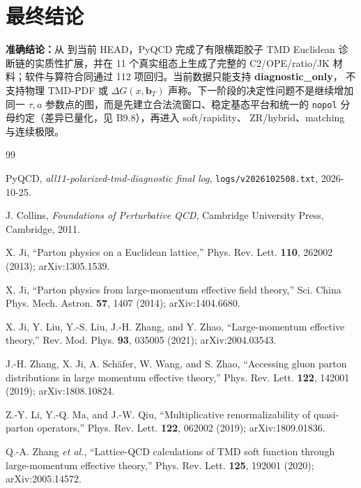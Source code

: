\documentclass[UTF8]{ctexart}
\newcommand{\code}[1]{\texttt{\detokenize{#1}}}
\newcommand{\pathref}[1]{\texttt{\nolinkurl{#1}}}
\newcommand{\bT}{\boldsymbol b_T}
\newcommand{\statusdiag}{\textcolor{warn}{\textbf{diagnostic\_only}}}
\begin{document}
\section{最终结论}

\begin{conclbox}
\textbf{准确结论：}从 \code{dev25} 到当前 HEAD，PyQCD 完成了有限横距胶子 TMD
Euclidean 诊断链的实质性扩展，并在 11 个真实组态上生成了完整的 C2/OPE/ratio/JK
材料；软件与算符合同通过 112 项回归。当前数据只能支持 \statusdiag，
不支持物理 TMD-PDF 或 \(\Delta G(x,\bT)\) 声称。下一阶段的决定性问题不是继续增加
同一 \(\tau,a\) 参数点的图，而是先建立合法流窗口、稳定基态平台和统一的
\texttt{nopol} 分母约定（差异已量化，见 B9.8），再进入 soft/rapidity、
ZR/hybrid、matching 与连续极限。
\end{conclbox}

\begin{thebibliography}{99}

PyQCD,
\newblock \textit{all11-polarized-tmd-diagnostic final log},
\newblock \pathref{logs/v2026102508.txt}, 2026-10-25.

J. Collins,
\newblock \textit{Foundations of Perturbative QCD},
\newblock Cambridge University Press, Cambridge, 2011.

X. Ji,
\newblock ``Parton physics on a Euclidean lattice,''
\newblock Phys. Rev. Lett. \textbf{110}, 262002 (2013);
arXiv:1305.1539.

X. Ji,
\newblock ``Parton physics from large-momentum effective field theory,''
\newblock Sci. China Phys. Mech. Astron. \textbf{57}, 1407 (2014);
arXiv:1404.6680.

X. Ji, Y. Liu, Y.-S. Liu, J.-H. Zhang, and Y. Zhao,
\newblock ``Large-momentum effective theory,''
\newblock Rev. Mod. Phys. \textbf{93}, 035005 (2021); arXiv:2004.03543.

J.-H. Zhang, X. Ji, A. Schäfer, W. Wang, and S. Zhao,
\newblock ``Accessing gluon parton distributions in large momentum effective theory,''
\newblock Phys. Rev. Lett. \textbf{122}, 142001 (2019); arXiv:1808.10824.

Z.-Y. Li, Y.-Q. Ma, and J.-W. Qiu,
\newblock ``Multiplicative renormalizability of quasi-parton operators,''
\newblock Phys. Rev. Lett. \textbf{122}, 062002 (2019); arXiv:1809.01836.

Q.-A. Zhang \textit{et al.},
\newblock ``Lattice-QCD calculations of TMD soft function through large-momentum effective theory,''
\newblock Phys. Rev. Lett. \textbf{125}, 192001 (2020); arXiv:2005.14572.


\end{thebibliography}
\end{document}
